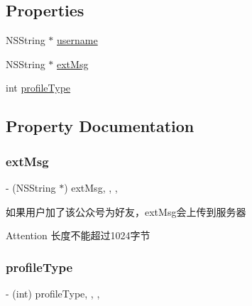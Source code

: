 \subsection*{Properties}
\begin{DoxyCompactItemize}
\item 
N\+S\+String $\ast$ \mbox{\hyperlink{interface_jump_to_biz_profile_req_ad217e5e684d4db4977260fc8df38003b}{username}}
\item 
N\+S\+String $\ast$ \mbox{\hyperlink{interface_jump_to_biz_profile_req_a6179858a3c37c3853436600909ec1ef8}{ext\+Msg}}
\item 
int \mbox{\hyperlink{interface_jump_to_biz_profile_req_ac741de9ab2299d83f5383fefdfb534d2}{profile\+Type}}
\end{DoxyCompactItemize}


\subsection{Property Documentation}
\mbox{\label{interface_jump_to_biz_profile_req_a6179858a3c37c3853436600909ec1ef8}} 
\subsubsection{\texorpdfstring{ext\+Msg}{extMsg}}
{\footnotesize\ttfamily -\/ (N\+S\+String $\ast$) ext\+Msg\hspace{0.3cm}{\ttfamily [read]}, {\ttfamily [write]}, {\ttfamily [nonatomic]}, {\ttfamily [retain]}}

如果用户加了该公众号为好友，ext\+Msg会上传到服务器 \begin{DoxyAttention}{Attention}
长度不能超过1024字节 
\end{DoxyAttention}
\mbox{\label{interface_jump_to_biz_profile_req_ac741de9ab2299d83f5383fefdfb534d2}} 
\subsubsection{\texorpdfstring{profile\+Type}{profileType}}
{\footnotesize\ttfamily -\/ (int) profile\+Type\hspace{0.3cm}{\ttfamily [read]}, {\ttfamily [write]}, {\ttfamily [nonatomic]}, {\ttfamily [assign]}}

